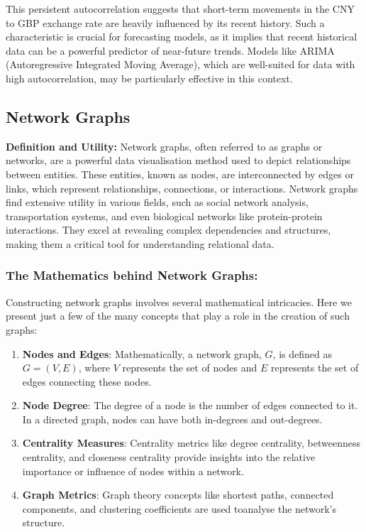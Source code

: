 \documentclass{article}\usepackage[]{graphicx}\usepackage[]{xcolor}
\begin{document}
\noindent
This persistent autocorrelation suggests that short-term movements in the CNY to GBP exchange rate are heavily influenced by its recent history. Such a characteristic is crucial for forecasting models, as it implies that recent historical data can be a powerful predictor of near-future trends. Models like ARIMA (Autoregressive Integrated Moving Average), which are well-suited for data with high autocorrelation, may be particularly effective in this context.



\subsection{Network Graphs}

\textbf{Definition and Utility:}
Network graphs, often referred to as graphs or networks, are a powerful data visualisation method used to depict relationships between entities. These entities, known as nodes, are interconnected by edges or links, which represent relationships, connections, or interactions. Network graphs find extensive utility in various fields, such as social network analysis, transportation systems, and even biological networks like protein-protein interactions. They excel at revealing complex dependencies and structures, making them a critical tool for understanding relational data.

\subsubsection{The Mathematics behind Network Graphs:}
Constructing network graphs involves several mathematical intricacies. Here we present just a few of the many concepts that play a role in the creation of such graphs:

\begin{enumerate}
\item \textbf{Nodes and Edges}: Mathematically, a network graph, \(G\), is defined as \(G = (V, E)\), where \(V\) represents the set of nodes and \(E\) represents the set of edges connecting these nodes.
\item \textbf{Node Degree}: The degree of a node is the number of edges connected to it. In a directed graph, nodes can have both in-degrees and out-degrees.
\item \textbf{Centrality Measures}: Centrality metrics like degree centrality, betweenness centrality, and closeness centrality provide insights into the relative importance or influence of nodes within a network.
\item \textbf{Graph Metrics}: Graph theory concepts like shortest paths, connected components, and clustering coefficients are used toanalyse the network's structure.
\end{enumerate}
\end{document}
